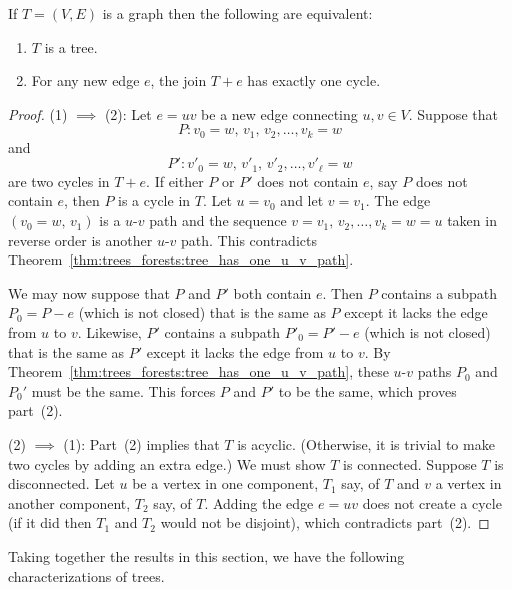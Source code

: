 \begin{theorem}
If $T = (V,E)$ is a graph then the following are equivalent:
\begin{enumerate}
\item $T$ is a tree.

\item For any new edge $e$, the join $T + e$ has exactly
  one cycle.
\end{enumerate}
\end{theorem}

\begin{proof}
(1) $\implies$ (2):
Let $e = uv$ be a new edge connecting $u,v \in V$. Suppose that
\[
P : v_0 = w,\, v_1,\, v_2, \dots, v_k = w
\]
and
\[
P' : v'_0 = w,\, v'_1,\, v'_2, \dots, v'_\ell = w
\]
are two cycles in $T + e$. If either $P$ or $P'$ does not contain $e$,
say $P$ does not contain $e$, then $P$ is a cycle in $T$. Let
$u = v_0$ and let $v = v_1$. The edge $(v_0 = w,\, v_1)$ is a $u$-$v$
path and the sequence $v = v_1,\, v_2, \dots, v_k = w = u$ taken in
reverse order is another $u$-$v$ path. This contradicts
Theorem~\ref{thm:trees_forests:tree_has_one_u_v_path}.

We may now suppose that $P$ and $P'$ both contain $e$. Then $P$
contains a subpath $P_0 = P - e$ (which is not closed) that is the
same as $P$ except it lacks the edge from $u$ to $v$. Likewise, $P'$
contains a subpath $P'_0=P'-e$ (which is not closed) that is the same
as $P'$ except it lacks the edge from $u$ to $v$. By
Theorem~\ref{thm:trees_forests:tree_has_one_u_v_path}, these $u$-$v$
paths $P_0$ and $P_0'$ must be the same. This forces $P$ and $P'$ to
be the same, which proves part~(2).

(2) $\implies$ (1):
Part~(2) implies that $T$ is acyclic. (Otherwise, it is trivial
to make two cycles by adding an extra edge.) We must show $T$ is
connected. Suppose $T$ is disconnected. Let $u$ be a vertex in one
component, $T_1$ say, of $T$ and $v$ a vertex in another component,
$T_2$ say, of $T$. Adding the edge $e = uv$ does not create a cycle
(if it did then $T_1$ and $T_2$ would not be disjoint), which
contradicts part~(2).
\end{proof}

Taking together the results in this section, we have the following
characterizations of trees.

